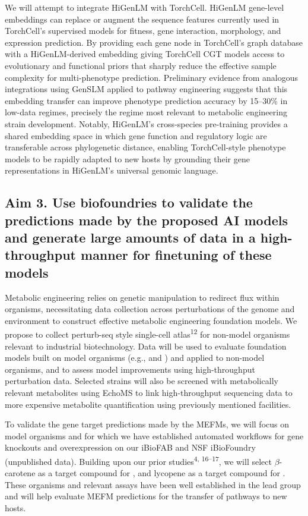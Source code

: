 We will attempt to integrate HiGenLM with TorchCell. HiGenLM gene-level embeddings
can replace or augment the sequence features currently used in TorchCell's
supervised models for fitness, gene interaction, morphology, and expression
prediction. By providing each gene node in TorchCell's graph database with a
HiGenLM-derived embedding giving TorchCell CGT models access to evolutionary and
functional priors that sharply reduce the effective sample complexity for
multi-phenotype prediction. Preliminary evidence from analogous integrations using
GenSLM applied to  pathway engineering suggests that this embedding
transfer can improve phenotype prediction accuracy by 15--30\% in low-data regimes,
precisely the regime most relevant to metabolic engineering strain development.
Notably, HiGenLM's cross-species pre-training provides a shared embedding space in
which gene function and regulatory logic are transferable across phylogenetic
distance, enabling TorchCell-style phenotype models to be rapidly adapted to new
hosts by grounding their gene representations in HiGenLM's universal genomic
language.

\subsection{Aim 3. Use biofoundries to validate the predictions made by the
proposed AI models and generate large amounts of data in a high-throughput manner
for finetuning of these models}\label{sec:aim3}

Metabolic engineering relies on genetic manipulation to redirect flux within
organisms, necessitating data collection across perturbations of the genome and
environment to construct effective metabolic engineering foundation models. We
propose to collect perturb-seq style single-cell atlas\textsuperscript{12} for
non-model organisms relevant to industrial biotechnology. Data will be used to
evaluate foundation models built on model organisms (e.g.,  and
) and applied to non-model organisms, and to assess model improvements
using high-throughput perturbation data. Selected strains will also be screened with
metabolically relevant metabolites using EchoMS to link high-throughput sequencing
data to more expensive metabolite quantification using previously mentioned
facilities.

To validate the gene target predictions made by the MEFMs, we will focus on model
organisms  and  for which we have established
automated workflows for gene knockouts and overexpression on our iBioFAB and NSF
iBioFoundry (unpublished data). Building upon our prior
studies\textsuperscript{4, 16--17}, we will select $\beta$-carotene as a target
compound for , and lycopene as a target compound for . These organisms and relevant assays have been well established in the lead
group and will help evaluate MEFM predictions for the transfer of pathways to new
hosts.
